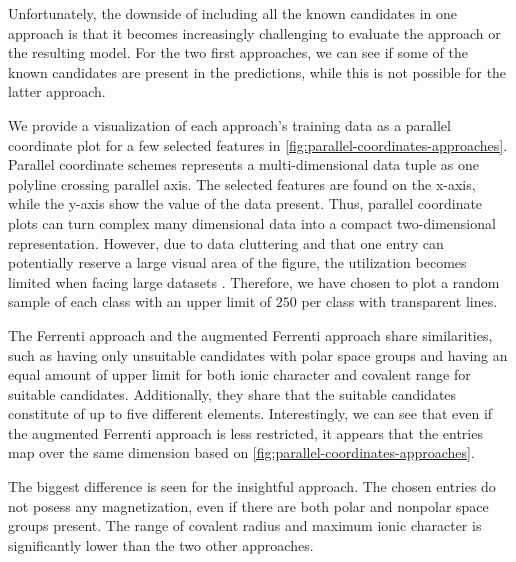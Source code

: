 
Unfortunately, the downside of including all the known candidates in one approach is that it becomes increasingly challenging to evaluate the approach or the resulting model. For the two first approaches, we can see if some of the known candidates are present in the predictions, while this is not possible for the latter approach.

We provide a visualization of each approach's training data as a parallel coordinate plot for a few selected features in \autoref{fig:parallel-coordinates-approaches}. Parallel coordinate schemes \cite{Inselberg1985, Inselberga1990} represents a multi-dimensional data tuple as one polyline crossing parallel axis. The selected features are found on the x-axis, while the y-axis show the value of the data present. Thus, parallel coordinate plots can turn complex many dimensional data into a compact two-dimensional representation. However, due to data cluttering and that one entry can potentially reserve a large visual area of the figure, the utilization becomes limited when facing large datasets \cite{Ericsona}. Therefore, we have chosen to plot a random sample of each class with an upper limit of $250$ per class with transparent lines.

The Ferrenti approach and the augmented Ferrenti approach share similarities, such as having only unsuitable candidates with polar space groups and having an equal amount of upper limit for both ionic character and covalent range for suitable candidates. Additionally, they share that the suitable candidates constitute of up to five different elements. Interestingly, we can see that even if the augmented Ferrenti approach is less restricted, it appears that the entries map over the same dimension based on \autoref{fig:parallel-coordinates-approaches}.

The biggest difference is seen for the insightful approach. The chosen entries do not posess any magnetization, even if there are both polar and nonpolar space groups present. The range of covalent radius and maximum ionic character is significantly lower than the two other approaches.

